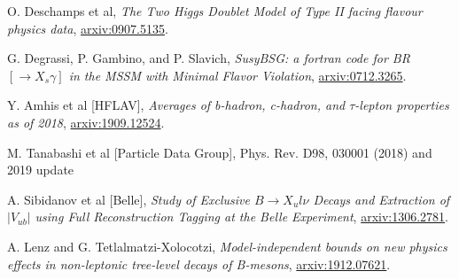 \documentclass[a4paper,12pt]{article}
\begin{document}
\begin{thebibliography}{99}

O. Deschamps et al, \emph{The Two Higgs Doublet Model of Type II facing flavour physics data}, \href{https://arxiv.org/pdf/0907.5135.pdf}{arxiv:0907.5135}.

G. Degrassi, P. Gambino, and P. Slavich, \emph{SusyBSG: a fortran code for BR$[\to X_s\gamma]$ in the MSSM with Minimal Flavor Violation}, \href{https://arxiv.org/pdf/0712.3265.pdf}{arxiv:0712.3265}.

Y. Amhis et al [HFLAV], \emph{Averages of b-hadron, c-hadron, and $\tau$-lepton properties as of 2018}, \href{https://arxiv.org/pdf/1909.12524.pdf}{arxiv:1909.12524}.

M. Tanabashi et al [Particle Data Group], Phys. Rev. D98, 030001 (2018) and 2019 update

A. Sibidanov et al [Belle], \emph{Study of Exclusive $B\to X_ul\nu$ Decays and Extraction of $|V_{ub}|$ using Full Reconstruction Tagging at the Belle Experiment}, \href{https://arxiv.org/pdf/1306.2781.pdf}{arxiv:1306.2781}.

A. Lenz and G. Tetlalmatzi-Xolocotzi, \emph{Model-independent bounds on new physics effects in non-leptonic tree-level decays of B-mesons}, \href{https://arxiv.org/pdf/1912.07621.pdf}{arxiv:1912.07621}.





\end{thebibliography}
\end{document}
